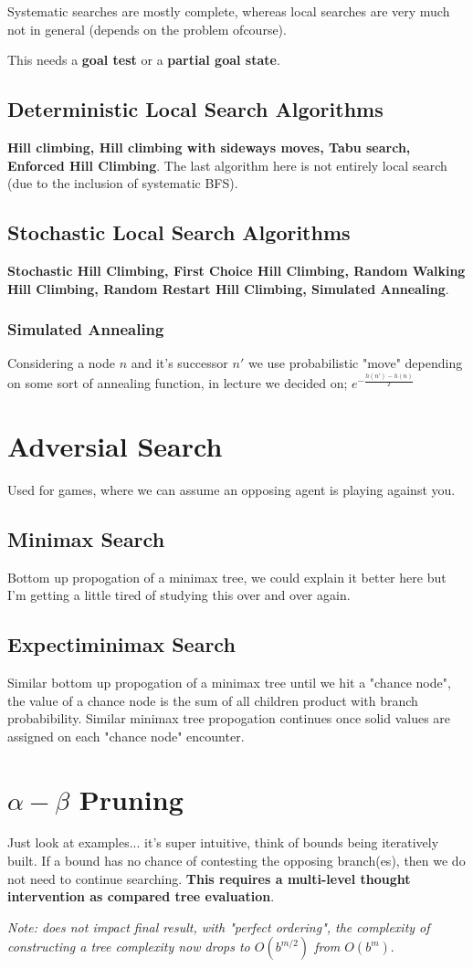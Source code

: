 \documentclass{article}
\begin{document}
Systematic searches are mostly complete, whereas local searches are very much not in general (depends on the problem ofcourse).

This needs a \textbf{goal test} or a \textbf{partial goal state}.

\subsection{Deterministic Local Search Algorithms}
\textbf{Hill climbing, Hill climbing with sideways moves, Tabu search, Enforced Hill Climbing}. The last algorithm here is not entirely local search (due to the inclusion of systematic BFS).

\subsection{Stochastic Local Search Algorithms}
\textbf{Stochastic Hill Climbing, First Choice Hill Climbing, Random Walking Hill Climbing, Random Restart Hill Climbing, Simulated Annealing}.

\subsubsection{Simulated Annealing}
Considering a node $n$ and it's successor $n'$ we use probabilistic "move" depending on some sort of annealing function, in lecture we decided on; $e^{-\frac{h(n')-h(n)}{T}}$

\section{Adversial Search}
Used for games, where we can assume an opposing agent is playing against you.

\subsection{Minimax Search}
Bottom up propogation of a minimax tree, we could explain it better here but I'm getting a little tired of studying this over and over again.

\subsection{Expectiminimax Search}
Similar bottom up propogation of a minimax tree until we hit a "chance node", the value of a chance node is the sum of all children product with branch probabibility. Similar minimax tree propogation continues once solid values are assigned on each "chance node" encounter.

\section{$\alpha-\beta$ Pruning}
Just look at examples... it's super intuitive, think of bounds being iteratively built. If a bound has no chance of contesting the opposing branch(es), then we do not need to continue searching. \textbf{This requires a multi-level thought intervention as compared tree evaluation}.

\emph{Note: does not impact final result, with "perfect ordering", the complexity of constructing a tree complexity now drops to $O(b^{m/2})$ from $O(b^m)$}.
\end{document}

